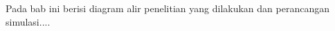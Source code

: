 \chapter{\babTiga}
Pada bab ini berisi diagram alir penelitian yang dilakukan dan perancangan simulasi....



